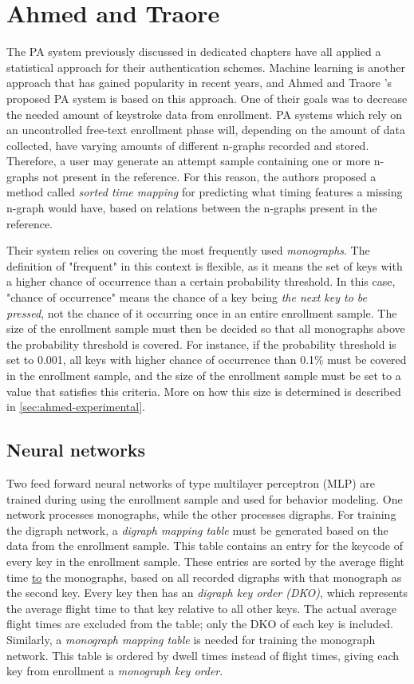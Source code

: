 \documentclass[informationsecurity]{gucmasterproject}
\begin{document}
\chapter{Ahmed and Traore}
\label{chap:ahmed}

The PA system previously discussed in dedicated chapters have all applied a statistical approach for their authentication schemes.
Machine learning is another approach that has gained popularity in recent years, and Ahmed and Traore \cite{Ahmed}'s proposed PA system is based on this approach.
One of their goals was to decrease the needed amount of keystroke data from enrollment.
PA systems which rely on an uncontrolled free-text enrollment phase will, depending on the amount of data collected, have varying amounts of different n-graphs recorded and stored.
Therefore, a user may generate an attempt sample containing one or more n-graphs not present in the reference.
For this reason, the authors proposed a method called \textit{sorted time mapping} for predicting what timing features a missing n-graph would have, based on relations between the n-graphs present in the reference.

Their system relies on covering the most frequently used \textit{monographs}.
The definition of "frequent" in this context is flexible, as it means the set of keys with a higher chance of occurrence than a certain probability threshold.
In this case, "chance of occurrence" means the chance of a key being \textit{the next key to be pressed}, not the chance of it occurring once in an entire enrollment sample.
The size of the enrollment sample must then be decided so that all monographs above the probability threshold is covered.
For instance, if the probability threshold is set to 0.001, all keys with higher chance of occurrence than 0.1\% must be covered in the enrollment sample, and the size of the enrollment sample must be set to a value that satisfies this criteria.
More on how this size is determined is described in \cref{sec:ahmed-experimental}.

\section{Neural networks}
Two feed forward neural networks of type multilayer perceptron (MLP) are trained during using the enrollment sample and used for behavior modeling.
One network processes monographs, while the other processes digraphs.
For training the digraph network, a \textit{digraph mapping table} must be generated based on the data from the enrollment sample.
This table contains an entry for the keycode of every key in the enrollment sample.
These entries are sorted by the average flight time \underline{to} the monographs, based on all recorded digraphs with that monograph as the second key.
Every key then has an \textit{digraph key order (DKO)}, which represents the average flight time to that key relative to all other keys. 
The actual average flight times are excluded from the table; only the DKO of each key is included.
Similarly, a \textit{monograph mapping table} is needed for training the monograph network. 
This table is ordered by dwell times instead of flight times, giving each key from enrollment a \textit{monograph key order}.
\end{document}
